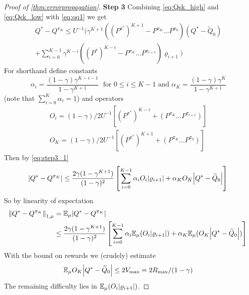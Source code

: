 \documentclass{article}
\theoremstyle{definition}
\newcommand{\bb}{\mathbb}
\newcommand{\E}{\bb{E}}
\newcommand{\wt}{\widetilde}
\begin{document}
\begin{proof}[Proof of \cref{thm:errorpropagation}]
  \textbf{Step 3}
Combining \cref{eq:Qsk_high} and \cref{eq:Qsk_low} with \cref{eq:qq1} we get
  \begin{equation}
    \begin{split}
      Q^* - Q^{\pi_K} \leq U^{-1} \bigg(
	\gamma^{K+1}((P^{\pi^*})^{K+1} - P^{\pi_K} \dots P^{\pi_0})(Q^* - \wt{Q}_0)
	\\ + \sum_{i=0}^{K-1} \gamma^{K-i}
      ((P^*)^{K-i} - P^{\pi_K} \dots P^{\pi_{i+1}}) \varrho_{i+1} \bigg)
    \end{split}
    \label{eq:step3_1}
  \end{equation}
  For shorthand define constants
  \begin{equation} \alpha_i = \frac{(1-\gamma) \gamma^{K-i-1}}{1 - \gamma^{K+1}}
    \; \mbox{ for } 0 \leq i \leq K-1 \mbox{ and }
    \alpha_K = \frac{(1-\gamma) \gamma^K}{1 - \gamma^{K+1}}
  \end{equation}
  (note that $\sum_{i=0}^K \alpha_i = 1$) and operators
  \begin{align}
    O_i = (1-\gamma)/2 U^{-1} [(P^{\pi^*})^{K-i}
    + (P^{\pi_K} \dots P^{\pi_{i+1}})]
    \\ O_K = (1-\gamma)/2 U^{-1} [(P^{\pi^*})^{K+1}
    + (P^{\pi_K} \dots P^{\pi_0})]
  \end{align}
  Then by \cref{eq:step3_1}
  \begin{align}
    \abs{Q^* - Q^{\pi_K}} \leq \frac{2 \gamma (1- \gamma^{K+1})}{(1-\gamma)^2}
    \left[ \sum_{i=0}^{K-1} \alpha_i O_i \abs{\varrho_{i+1}}
    + \alpha_K O_K \abs{Q^* - \wt{Q}_0} \right]
  \end{align}
  So by linearity of expectation
  \begin{align}
    \norm{Q^* - Q^{\pi_K}}_{1, \mu} &= \E_\mu \abs{Q^* - Q^{\pi_K}}
    \\ &\leq \frac{2 \gamma (1- \gamma^{K+1})}{(1-\gamma)^2}
    \left[ \sum_{i=0}^{K-1} \alpha_i \E_\mu (O_i \abs{\varrho_{i+1}})
    + \alpha_K \E_\mu (O_K \abs{Q^* - \wt{Q}_0}) \right]
    \label{eq:step3_final}
  \end{align}
  With the bound on rewards we (crudely) estimate
  \begin{equation}
    \E_\mu O_K \abs{Q^* - \wt{Q}_0} \leq 2 V_{\max} = 2 R_{\max} / (1-\gamma)
    \label{eq:step3_crude}
  \end{equation}
  The remaining difficulty lies in $\E_\mu(O_i\abs{\varrho_{i+1}})$.


\end{proof}
\end{document}
